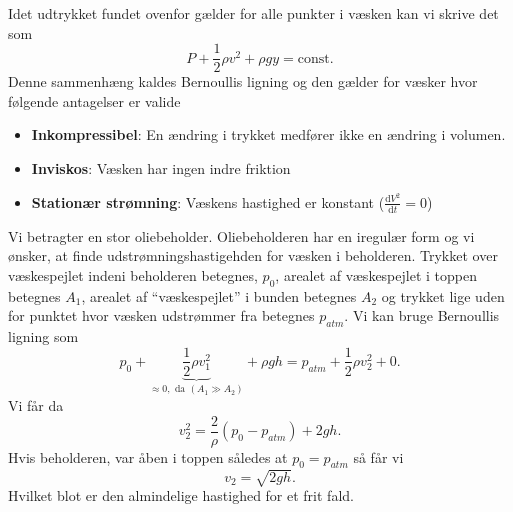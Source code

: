 \begin{sæt}
  Idet udtrykket fundet ovenfor gælder for alle punkter i væsken kan vi skrive det som
  \[ 
    P + \frac{1}{2}\rho v^2 + \rho g y = \mathrm{const}
  .\]
  Denne sammenhæng kaldes Bernoullis ligning og den gælder for væsker hvor følgende antagelser er valide
  \begin{itemize}
    \item \textbf{Inkompressibel}: En ændring i trykket medfører ikke en ændring i volumen.
    \item \textbf{Inviskos}: Væsken har ingen indre friktion
    \item \textbf{Stationær strømning}: Væskens hastighed er konstant ($\frac{\mathrm{d}V^2}{\mathrm{d}t} = 0$)
  \end{itemize}
\end{sæt}

\begin{eks}[Udstrømningshastighed (12.8)]
  Vi betragter en stor oliebeholder. Oliebeholderen har en iregulær form og vi ønsker, at finde udstrømningshastigehden for væsken i beholderen. Trykket over væskespejlet indeni beholderen betegnes, $p_0$, arealet af væskespejlet i toppen betegnes $A_1$, arealet af ``væskespejlet'' i bunden betegnes $A_2$ og trykket lige uden for punktet hvor væsken udstrømmer fra betegnes $p_{atm}$. Vi kan bruge Bernoullis ligning som
  \[ 
  p_0 + \underbrace{\frac{1}{2} \rho v_1^2}_{\approx 0, \text{ da } (A_1 \gg A_2)} + \rho gh = p_{atm} + \frac{1}{2} \rho v_2^2 + 0
  .\]
  Vi får da
  \[ 
  v_2^2 = \frac{2}{\rho}(p_0 - p_{atm}) + 2gh
  .\]
  Hvis beholderen, var åben i toppen således at $p_0 = p_{atm}$ så får vi
  \[ 
  v_2 = \sqrt{2gh}
  .\]
  Hvilket blot er den almindelige hastighed for et frit fald.
\end{eks}

